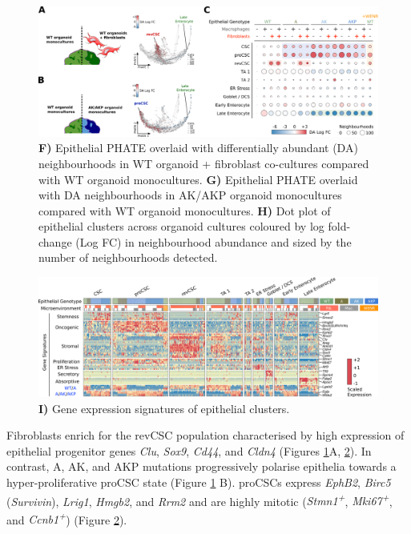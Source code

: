 \begin{figure}
    \centering
    \includegraphics{04seq/figs/4SEQ_DA.png}
    \caption{\textbf{F)} Epithelial PHATE overlaid with differentially abundant (DA) neighbourhoods in WT organoid + fibroblast co-cultures compared with WT organoid monocultures. \textbf{G)} Epithelial PHATE overlaid with DA neighbourhoods in AK/AKP organoid monocultures compared with WT organoid monocultures. \textbf{H)} Dot plot of epithelial clusters across organoid cultures coloured by log fold-change (Log FC) in neighbourhood abundance and sized by the number of neighbourhoods detected.}
    \label{fig:4da}
\end{figure}
\begin{figure}
    \centering
    \includegraphics{04seq/figs/4SEQ_DE.png}
    \caption{\textbf{I)} Gene expression signatures of epithelial clusters.}
    \label{fig:4de}
\end{figure}

Fibroblasts enrich for the revCSC population characterised by high expression of epithelial progenitor genes \textit{Clu}, \textit{Sox9}, \textit{Cd44}, and \textit{Cldn4} (Figures \ref{fig:4da}A, \ref{fig:4de}). In contrast, A, AK, and AKP mutations progressively polarise epithelia towards a hyper-proliferative proCSC state (Figure \ref{fig:4da} B). proCSCs express \textit{EphB2}, \textit{Birc5} (\textit{Survivin}), \textit{Lrig1}, \textit{Hmgb2}, and \textit{Rrm2} and are highly mitotic (\textit{Stmn1\textsuperscript{+}}, \textit{Mki67\textsuperscript{+}}, and \textit{Ccnb1\textsuperscript{+}}) (Figure \ref{fig:4de}). 

